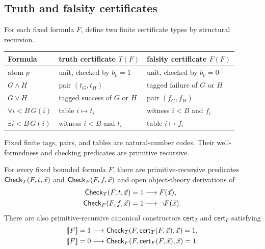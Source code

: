 \subsection{Truth and falsity certificates}

For each fixed formula \(F\), define two finite certificate types by structural recursion.
\begin{center}
\begin{tabularx}{\textwidth}{@{}lXX@{}}
\toprule
Formula & truth certificate \(T(F)\) & falsity certificate \(F(F)\) \\
\midrule
atom \(p\) & unit, checked by \(b_p=1\) & unit, checked by \(b_p=0\) \\
\(G\wedge H\) & pair \((t_G,t_H)\) & tagged failure of \(G\) or \(H\) \\
\(G\vee H\) & tagged success of \(G\) or \(H\) & pair \((f_G,f_H)\) \\
\(\forall i<B\,G(i)\) & table \(i\mapsto t_i\) & witness \(i<B\) and \(f_i\) \\
\(\exists i<B\,G(i)\) & witness \(i<B\) and \(t_i\) & table \(i\mapsto f_i\) \\
\bottomrule
\end{tabularx}
\end{center}
Fixed finite tags, pairs, and tables are natural-number codes.  Their well-formedness and checking predicates are primitive recursive.

\begin{theorem}\label{thm:strategy-reflection}
For every fixed bounded formula \(F\), there are primitive-recursive predicates
\(\mathsf{Check}_T(F,t,\vec x)\) and \(\mathsf{Check}_F(F,f,\vec x)\) and open object-theory derivations of
\begin{align*}
 \mathsf{Check}_T(F,t,\vec x)=1 &\longrightarrow F(\vec x),\\
 \mathsf{Check}_F(F,f,\vec x)=1 &\longrightarrow \neg F(\vec x).
\end{align*}
There are also primitive-recursive canonical constructors \(\mathsf{cert}_T\) and \(\mathsf{cert}_F\) satisfying
\begin{align*}
 \llbracket F\rrbracket=1 &\longrightarrow
   \CertCheck_T(F,\mathsf{cert}_T(F,\vec x),\vec x)=1,\\
 \llbracket F\rrbracket=0 &\longrightarrow
   \CertCheck_F(F,\mathsf{cert}_F(F,\vec x),\vec x)=1.
\end{align*}
\end{theorem}

